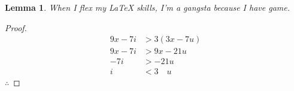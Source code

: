 \documentclass{article}
\newtheorem{lemma}[theorem]{Lemma}
\theoremstyle{remark}
\theoremstyle{definition}
\begin{document}
\begin{lemma}
When I flex my \LaTeX{} skills, I'm a gangsta because I have game.
\end{lemma}
 
\begin{proof}
\begin{align}
    9x-7i &> 3(3x-7u)\\
    9x-7i &> 9x - 21u\\
    -7i &> -21u\\
    i \quad &<3 \quad u
\end{align}
$\therefore$ 
\end{proof}
\end{document}
